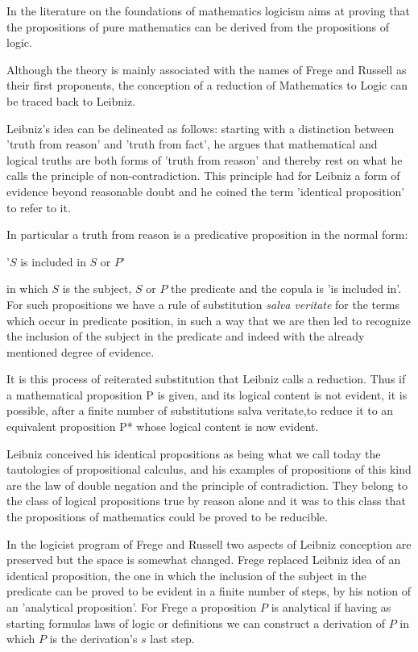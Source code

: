 \documentclass[12pt]{article}
\begin{document}
In the literature on the foundations of mathematics logicism aims at proving that the propositions of pure mathematics can be derived from the propositions of logic.

Although the theory is mainly associated with the names of Frege and Russell as their first proponents, the conception of a reduction of Mathematics to Logic can be traced back to Leibniz.

Leibniz's idea can be delineated as follows: starting with a distinction between 'truth from reason' and 'truth from fact',  he argues that mathematical and logical truths are both forms of 'truth from reason' and thereby rest on what he calls the principle of non-contradiction. This principle had for Leibniz a form of evidence beyond reasonable doubt and he coined the term 'identical proposition' to refer to it. 

In particular a truth from reason is a predicative proposition in the normal form: 

\begin{center}
'$S$ is included in $S$ or $P$'
\end{center}

in which $S$ is the subject, $S$ or $P$ the predicate and the copula is 'is included in'. For such  propositions we have a rule of substitution \emph{salva veritate} for the terms which occur in predicate position, in such a way that we are then led to recognize the inclusion of the subject in the predicate and indeed with the already mentioned degree of evidence. 

It is this process of reiterated substitution that Leibniz calls a reduction. Thus if a mathematical proposition P is given, and its logical content is not evident, it is possible, after a finite number of substitutions salva veritate,to reduce it to an equivalent proposition P* whose logical content is now evident.

Leibniz conceived his identical propositions as being what we call today the tautologies of propositional calculus, and his examples of propositions of this kind are the law of double negation and the principle of contradiction. They belong to the class of logical  propositions true by reason alone and it was to this class that the propositions of mathematics could be proved to be reducible.

In the logicist program of Frege and Russell two aspects of Leibniz conception are preserved but the space is somewhat changed. Frege replaced Leibniz idea of an identical proposition, the one in which the inclusion of the subject in the predicate can be proved to be evident in a finite number of steps, by his notion of an 'analytical proposition'. For Frege a proposition $P$ is analytical if having as starting formulas laws of logic or definitions we can construct a derivation of $P$ in  which $P$ is the derivation's $s$ last step.
\end{document}
